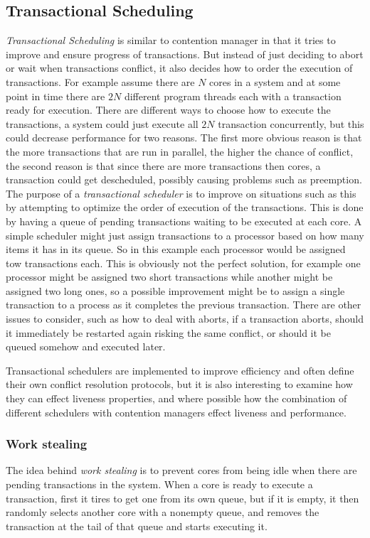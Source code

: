 \subsection{Transactional Scheduling}
\emph{Transactional Scheduling} is similar to contention manager in that it tries to improve and ensure progress of transactions.
But instead of just deciding to abort or wait when transactions conflict, it also decides how to order the execution of transactions.
For example assume there are $N$ cores in a system and at some point in time there are $2N$ different program threads each with a transaction ready for execution.
There are different ways to choose how to execute the transactions, a system could just execute all $2N$ transaction concurrently, but this could decrease performance for two reasons.
The first more obvious reason is that the more transactions that are run in parallel, the higher the chance of conflict, the second reason is that since there are more transactions then cores, a transaction could get descheduled, possibly causing problems such as preemption.
The purpose of a \emph{transactional scheduler} is to improve on situations such as this by attempting to optimize the order of execution of the transactions.
This is done by having a queue of pending transactions waiting to be executed at each core.
A simple scheduler might just assign transactions to a processor based on how many items it has in its queue.
So in this example each processor would be assigned tow transactions each.
This is obviously not the perfect solution, for example one processor might be assigned two short transactions while another might be assigned two long ones, so a possible improvement might be to assign a single transaction to a process as it completes the previous transaction.
There are other issues to consider, such as how to deal with aborts, if a transaction aborts, should it immediately be restarted again risking the same conflict, or should it be queued somehow and executed later.

Transactional schedulers are implemented to improve efficiency and often define their own conflict resolution protocols, but it is also interesting to examine how they can effect liveness properties, and where possible how the combination of different schedulers with contention managers effect liveness and performance.

\subsubsection{Work stealing}
The idea behind \emph{work stealing} \cite{1505821} is to prevent cores from being idle when there are pending transactions in the system.
When a core is ready to execute a transaction, first it tires to get one from its own queue, but if it is empty, it then randomly selects another core with a nonempty queue, and removes the transaction at the tail of that queue and starts executing it.

